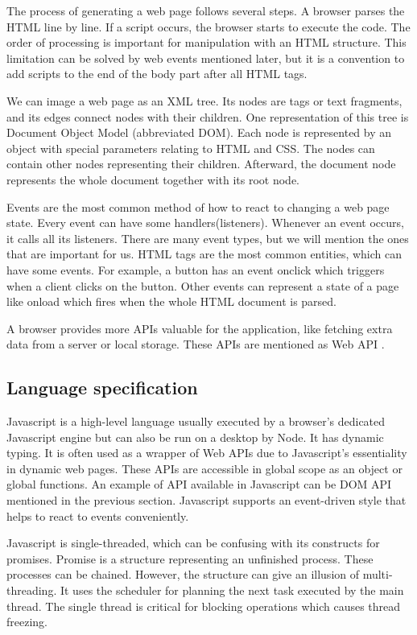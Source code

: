 The process of generating a web page follows several steps.
A browser parses the HTML line by line. If a script occurs, the browser starts to execute the code.
The order of processing is important for manipulation with an HTML structure.
This limitation can be solved by web events mentioned later, but
it is a convention to add scripts to the end of the body part after all HTML tags.

We can image a web page as an XML tree.
Its nodes are tags or text fragments, and its edges connect nodes with their children.
One representation of this tree is Document Object Model (abbreviated DOM).
Each node is represented by an object with special parameters relating to HTML and CSS. 
The nodes can contain other nodes representing their children.
Afterward, the document node represents the whole document together with its root node.

Events are the most common method of how to react to changing a web page state.
Every event can have some handlers(listeners).
Whenever an event occurs, it calls all its listeners.
There are many event types, but we will mention the ones that are important for us.
HTML tags are the most common entities, which can have some events.
For example, a button has an event onclick which triggers when a client clicks on the button. 
Other events can represent a state of a page like onload which fires when the whole HTML document is parsed.

A browser provides more APIs valuable for the application, like fetching extra data from a server or local storage.
These APIs are mentioned as Web API \cite{7}.

\subsection{Language specification}

Javascript is a high-level language usually executed by a browser's dedicated Javascript engine but can also be run on a desktop by Node.
It has dynamic typing.
It is often used as a wrapper of Web APIs due to Javascript's essentiality in dynamic web pages.
These APIs are accessible in global scope as an object or global functions.
An example of API available in Javascript can be DOM API mentioned in the previous section.
Javascript supports an event-driven style that helps to react to events conveniently.

Javascript is single-threaded, which can be confusing with its constructs for promises.
Promise is a structure representing an unfinished process.
These processes can be chained.
However, the structure can give an illusion of multi-threading. It uses the scheduler for planning the next task executed by the main thread.
The single thread is critical for blocking operations which causes thread freezing.

